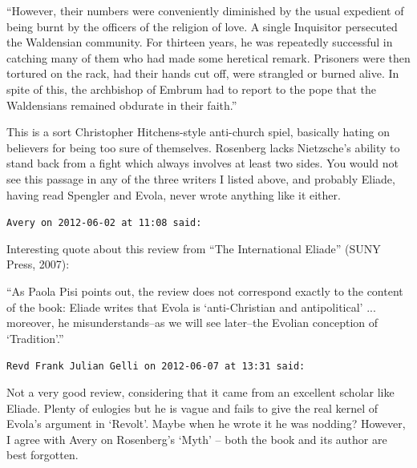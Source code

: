 \begin{footnotesize}
\begin{sffamily}
``However, their numbers were conveniently diminished by the usual expedient of being burnt by the officers of the religion of love. A single Inquisitor persecuted the Waldensian community. For thirteen years, he was repeatedly successful in catching many of them who had made some heretical remark. Prisoners were then tortured on the rack, had their hands cut off, were strangled or burned alive. In spite of this, the archbishop of Embrum had to report to the pope that the Waldensians remained obdurate in their faith.''

This is a sort Christopher Hitchens-style anti-church spiel, basically hating on believers for being too sure of themselves. Rosenberg lacks Nietzsche's ability to stand back from a fight which always involves at least two sides. You would not see this passage in any of the three writers I listed above, and probably Eliade, having read Spengler and Evola, never wrote anything like it either.

\hfill

\texttt{Avery on 2012-06-02 at 11:08 said:}

Interesting quote about this review from ``The International Eliade'' (SUNY Press, 2007):

``As Paola Pisi points out, the review does not correspond exactly to the content of the book: Eliade writes that Evola is `anti-Christian and antipolitical' ... moreover, he misunderstands--as we will see later--the Evolian conception of `Tradition'.''

\hfill

\texttt{Revd Frank Julian Gelli on 2012-06-07 at 13:31 said:}

Not a very good review, considering that it came from an excellent scholar like Eliade. Plenty of eulogies but he is vague and fails to give the real kernel of Evola's argument in `Revolt'. Maybe when he wrote it he was nodding? However, I agree with Avery on Rosenberg's `Myth' -- both the book and its author are best forgotten.

\end{sffamily}
\end{footnotesize}

